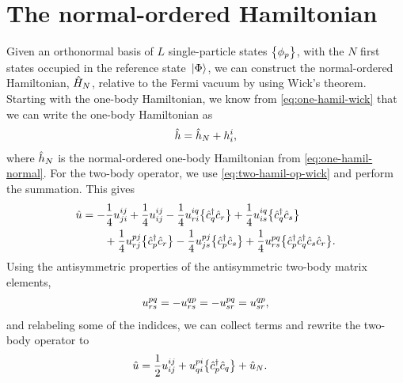     \section{The normal-ordered Hamiltonian}
        \label{app:normal-ordered-hamiltonian}
        Given an orthonormal basis of $L$ single-particle states
        $\left\{ \phi_p \right\}$, with the $N$ first states occupied in the reference
        state $\ket*{\Phi}$, we can construct the normal-ordered Hamiltonian,
        $\hat{H}_N$, relative to the Fermi vacuum by using Wick's theorem.
        Starting with the one-body Hamiltonian, we know from
        \autoref{eq:one-hamil-wick} that we can write the one-body Hamiltonian
        as
        \begin{align}
            \hat{h} = \hat{h}_N + h^{i}_{i},
        \end{align}
        where $\hat{h}_N$ is the normal-ordered one-body Hamiltonian from
        \autoref{eq:one-hamil-normal}.
        For the two-body operator, we use \autoref{eq:two-hamil-op-wick} and
        perform the summation.
        This gives
        \begin{align}
            \hat{u}
            &=
            - \frac{1}{4}u^{ij}_{ji}
            + \frac{1}{4}u^{ij}_{ij}
            - \frac{1}{4}u^{iq}_{ri}\bigl\{ 
                \hat{c}_{q}^{\dagger}
                \hat{c}_{r}
             \bigr\}
            + \frac{1}{4}u^{iq}_{is}\bigl\{ 
                \hat{c}_{q}^{\dagger}
                \hat{c}_{s}
             \bigr\}
            \nonumber \\
            &\qquad
            + \frac{1}{4}u^{pj}_{rj}\bigl\{ 
                \hat{c}_{p}^{\dagger}
                \hat{c}_{r}
             \bigr\}
            - \frac{1}{4}u^{pj}_{js}\bigl\{ 
                \hat{c}_{p}^{\dagger}
                \hat{c}_{s}
             \bigr\}
            + \frac{1}{4}u^{pq}_{rs}\bigl\{ 
                \hat{c}_{p}^{\dagger}
                \hat{c}_{q}^{\dagger}
                \hat{c}_{s}
                \hat{c}_{r}
             \bigr\}.
        \end{align}
        Using the antisymmetric properties of the antisymmetric two-body
        matrix elements,
        \begin{align}
            u^{pq}_{rs}
            =
            -u^{qp}_{rs}
            =
            -u^{pq}_{sr}
            =
            u^{qp}_{sr},
        \end{align}
        and relabeling some of the indidces, we can collect terms and rewrite
        the two-body operator to
        \begin{align}
            \hat{u}
            &=
            \frac{1}{2} u^{ij}_{ij}
            + u^{pi}_{qi}\bigl\{ 
                \hat{c}_{p}^{\dagger}
                \hat{c}_{q}
             \bigr\}
            + \hat{u}_N.
        \end{align}
